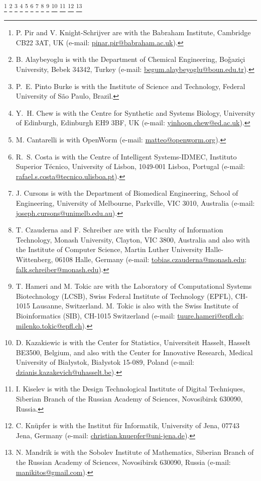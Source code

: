 \documentclass[journal,transmag]{IEEEtran}
\newcommand{\email}[1]{\href{mailto:#1}{#1}}
\begin{document}
{    \thanks{P. Pir and V. Knight-Schrijver are with the Babraham Institute, Cambridge CB22 3AT, UK (e-mail: \email{pinar.pir@babraham.ac.uk}).}
    \thanks{B. Alaybeyoglu is with the Department of Chemical Engineering, Bo\v{g}azi\c{c}i University, Bebek 34342, Turkey (e-mail: \email{begum.alaybeyoglu@boun.edu.tr}).}
    \thanks{P.~E. Pinto Burke is with the Institute of Science and Technology, Federal University of S\~{a}o Paulo, Brazil.}
    \thanks{Y.~H. Chew is with the Centre for Synthetic and Systems Biology, University of Edinburgh, Edinburgh EH9 3BF, UK (e-mail: \email{yinhoon.chew@ed.ac.uk}).}
    \thanks{M. Cantarelli is with OpenWorm (e-mail: \email{matteo@openworm.org}).}
    \thanks{R.~S. Costa is with the Centre of Intelligent Systems-IDMEC, Instituto Superior T{\'e}cnico, University of Lisbon, 1049-001 Lisboa, Portugal (e-mail: \email{rafael.s.costa@tecnico.ulisboa.pt}).}
    \thanks{J. Cursons is with the Department of Biomedical Engineering, School of Engineering, University of Melbourne, Parkville, VIC 3010, Australia (e-mail: \email{joseph.cursons@unimelb.edu.au}).}
    \thanks{T. Czauderna and F. Schreiber are with the Faculty of Information Technology, Monash University, Clayton, VIC 3800, Australia and also with the Institute of Computer Science, Martin Luther University Halle-Wittenberg, 06108 Halle, Germany (e-mail: \email{tobias.czauderna@monash.edu}; \email{falk.schreiber@monash.edu}).}
    \thanks{T. Hameri and M. Tokic are with the Laboratory of Computational Systems Biotechnology (LCSB), Swiss Federal Institute of Technology (EPFL), CH-1015 Lausanne, Switzerland. M. Tokic is also with the Swiss Institute of Bioinformatics (SIB), CH-1015 Switzerland (e-mail: \email{tuure.hameri@epfl.ch}; \email{milenko.tokic@epfl.ch}).}
    \thanks{D. Kazakiewic is with the Center for Statistics, Universiteit Hasselt, Hasselt BE3500, Belgium, and also with the Center for Innovative Research, Medical University of Bia\l{}ystok, Bia\l{}ystok 15-089, Poland (e-mail: \email{dzianis.kazakevich@uhasselt.be}).}
    \thanks{I. Kiselev is with the Design Technological Institute of Digital Techniques, Siberian Branch of the Russian Academy of Sciences, Novosibirsk 630090, Russia.}
    \thanks{C. Kn\"{u}pfer is with the Institut f\"ur Informatik, University of Jena, 07743 Jena, Germany (e-mail: \email{christian.knuepfer@uni-jena.de}).}
    \thanks{N. Mandrik is with the Sobolev Institute of Mathematics, Siberian Branch of the Russian Academy of Sciences, Novosibirsk 630090, Russia (e-mail: \email{manikitos@gmail.com}).}
}
\end{document}

